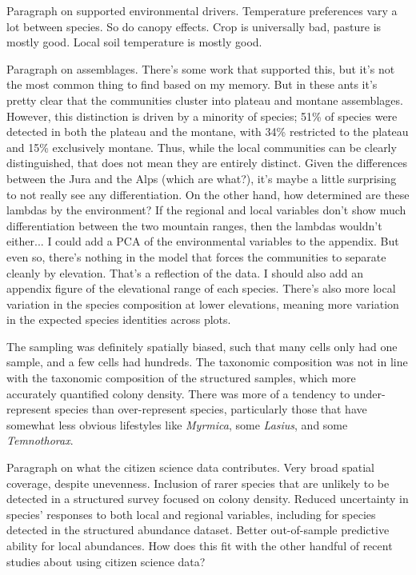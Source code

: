 \documentclass[preprint,review,times,12pt]{elsarticle}
\begin{document}
Paragraph on supported environmental drivers. Temperature preferences vary a lot between species. So do canopy effects. Crop is universally bad, pasture is mostly good. Local soil temperature is mostly good. 

Paragraph on assemblages. There's some work that supported this, but it's not the most common thing to find based on my memory. But in these ants it's pretty clear that the communities cluster into plateau and montane assemblages. However, this distinction is driven by a minority of species; 51\% of species were detected in both the plateau and the montane, with 34\% restricted to the plateau and 15\% exclusively montane. Thus, while the local communities can be clearly distinguished, that does not mean they are entirely distinct. Given the differences between the Jura and the Alps (which are what?), it's maybe a little surprising to not really see any differentiation. On the other hand, how determined are these lambdas by the environment? If the regional and local variables don't show much differentiation between the two mountain ranges, then the lambdas wouldn't either... I could add a PCA of the environmental variables to the appendix. But even so, there's nothing in the model that forces the communities to separate cleanly by elevation. That's a reflection of the data. I should also add an appendix figure of the elevational range of each species. There's also more local variation in the species composition at lower elevations, meaning more variation in the expected species identities across plots. 

The sampling was definitely spatially biased, such that many cells only had one sample, and a few cells had hundreds. The taxonomic composition was not in line with the taxonomic composition of the structured samples, which more accurately quantified colony density. There was more of a tendency to under-represent species than over-represent species, particularly those that have somewhat less obvious lifestyles like \emph{Myrmica}, some \emph{Lasius}, and some \emph{Temnothorax}.  

Paragraph on what the citizen science data contributes. Very broad spatial coverage, despite unevenness. Inclusion of rarer species that are unlikely to be detected in a structured survey focused on colony density. Reduced uncertainty in species' responses to both local and regional variables, including for species detected in the structured abundance dataset. Better out-of-sample predictive ability for local abundances. How does this fit with the other handful of recent studies about using citizen science data?
\end{document}
